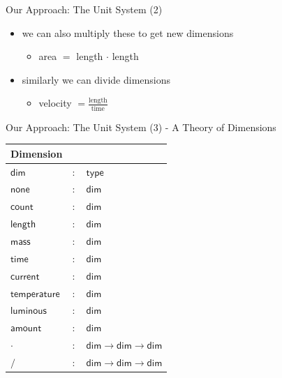 \documentclass{beamer}
\begin{document}
  \begin{frame}{Our Approach: The Unit System (2)}
    \begin{itemize}[<+->]

      \item we can also multiply these to get new dimensions
      \begin{itemize}
        \item area $=$ length $\cdot{}$ length
      \end{itemize}

      \item similarly we can divide dimensions
      \begin{itemize}
        \item velocity $= \frac{\text{length}}{\text{time}}$
      \end{itemize}
    \end{itemize}
  \end{frame}
  \begin{frame}{Our Approach: The Unit System (3) - A Theory of Dimensions}
    \begin{center}
      \begin{tabular}{|l l l|}
        \hline
        \textsf{Dimension} & &\\\hline
        $\mathsf{dim}$ & $:$ & $ \mathsf{type}$\\

        $\mathsf{none}$ & $:$ & $ \mathsf{dim}$\\
        $\mathsf{count}$ & $:$ & $ \mathsf{dim}$\\
        $\mathsf{length}$ & $:$ & $ \mathsf{dim}$\\
        $\mathsf{mass}$ & $:$ & $ \mathsf{dim}$\\
        $\mathsf{time}$ & $:$ & $ \mathsf{dim}$\\
        $\mathsf{current}$ & $:$ & $ \mathsf{dim}$\\
        $\mathsf{temperature}$ & $:$ & $ \mathsf{dim}$\\
        $\mathsf{luminous}$ & $:$ & $ \mathsf{dim}$\\
        $\mathsf{amount}$ & $:$ & $ \mathsf{dim}$\\

        $\cdot{}$ & $:$ & $ \mathsf{dim} \rightarrow \mathsf{dim} \rightarrow \mathsf{dim}$\\
        $/$ & $:$ & $ \mathsf{dim} \rightarrow \mathsf{dim} \rightarrow \mathsf{dim}$\\\hline
      \end{tabular}
  \end{center}
\end{frame}
\end{document}

